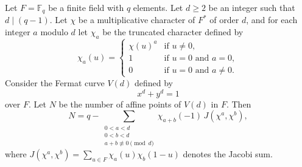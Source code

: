 Let $F = \mathbb{F}_q$ be a finite field with $q$ elements. Let $d \ge 2$ be an integer such that $d \mid (q-1)$. Let $\chi$ be a multiplicative character of $F^*$ of order $d$, and for each integer $a$ modulo $d$ let $\chi_a$ be the truncated character defined by
$$\chi_a(u) = \begin{cases}
\chi(u)^a & \text{if } u \neq 0,\\
1 & \text{if } u = 0 \text{ and } a = 0,\\
0 & \text{if } u = 0 \text{ and } a \neq 0.
\end{cases}$$
Consider the Fermat curve $V(d)$ defined by
$$x^d + y^d = 1$$
over $F$. Let $N$ be the number of affine points of $V(d)$ in $F$. Then
$$N = q - \sum_{\substack{0 < a < d \\ 0 < b < d \\ a + b \not\equiv 0 \pmod{d}}} \chi_{a+b}(-1) \, J(\chi^a, \chi^b),$$
where $J(\chi^a, \chi^b) = \sum_{u \in F} \chi_a(u) \chi_b(1-u)$ denotes the Jacobi sum.
